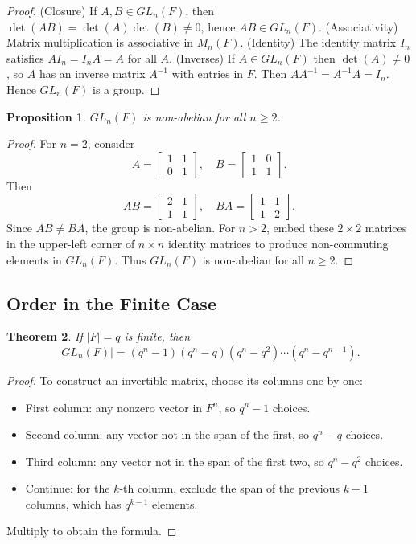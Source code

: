 \documentclass[12pt]{article}
\newtheorem{theorem}{Theorem}
\newtheorem{proposition}[theorem]{Proposition}
\theoremstyle{definition}
\begin{document}
\begin{proof}
(Closure) If $A,B\in GL_n(F)$, then $\det(AB)=\det(A)\det(B)\neq 0$, hence $AB\in GL_n(F)$.  
(Associativity) Matrix multiplication is associative in $M_n(F)$.  
(Identity) The identity matrix $I_n$ satisfies $AI_n=I_nA=A$ for all $A$.  
(Inverses) If $A\in GL_n(F)$ then $\det(A)\neq 0$, so $A$ has an inverse matrix $A^{-1}$ with entries in $F$. Then $AA^{-1}=A^{-1}A=I_n$.  
Hence $GL_n(F)$ is a group.
\end{proof}

\begin{proposition}
$GL_n(F)$ is non-abelian for all $n\geq 2$.
\end{proposition}

\begin{proof}
For $n=2$, consider
\[
A=\begin{bmatrix}1&1\\0&1\end{bmatrix},\quad
B=\begin{bmatrix}1&0\\1&1\end{bmatrix}.
\]
Then
\[
AB=\begin{bmatrix}2&1\\1&1\end{bmatrix},\quad
BA=\begin{bmatrix}1&1\\1&2\end{bmatrix}.
\]
Since $AB\neq BA$, the group is non-abelian. For $n>2$, embed these $2\times 2$ matrices in the upper-left corner of $n\times n$ identity matrices to produce non-commuting elements in $GL_n(F)$. Thus $GL_n(F)$ is non-abelian for all $n\geq 2$.
\end{proof}

\subsection*{Order in the Finite Case}
\begin{theorem}
If $|F|=q$ is finite, then
\[
|GL_n(F)| = (q^n-1)(q^n-q)(q^n-q^2)\cdots(q^n-q^{n-1}).
\]
\end{theorem}

\begin{proof}
To construct an invertible matrix, choose its columns one by one:
\begin{itemize}
    \item First column: any nonzero vector in $F^n$, so $q^n-1$ choices.
    \item Second column: any vector not in the span of the first, so $q^n-q$ choices.
    \item Third column: any vector not in the span of the first two, so $q^n-q^2$ choices.
    \item Continue: for the $k$-th column, exclude the span of the previous $k-1$ columns, which has $q^{k-1}$ elements.
\end{itemize}
Multiply to obtain the formula.
\end{proof}
\end{document}
